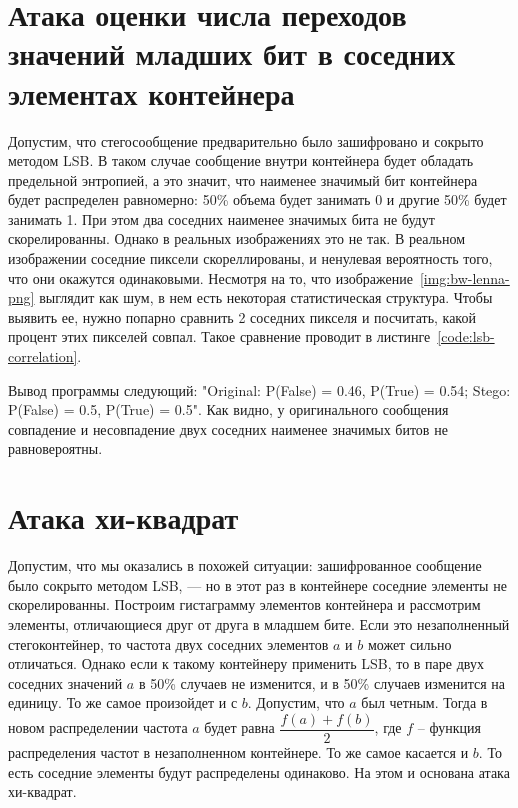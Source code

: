 \section{Атака оценки числа переходов значений младших бит в соседних элементах контейнера}
Допустим, что стегосообщение предварительно было зашифровано и сокрыто методом LSB.
В таком случае сообщение внутри контейнера будет обладать предельной энтропией,
а это значит, что наименее значимый бит контейнера будет распределен равномерно:
50\% объема будет занимать 0 и другие 50\% будет занимать 1. При этом два соседних
наименее значимых бита не будут скорелированны. Однако в реальных изображениях это не так.
В реальном изображении соседние пиксели скореллированы, и ненулевая вероятность того,
что они окажутся одинаковыми. Несмотря на то, что изображение~\ref{img:bw-lenna-png}
выглядит как шум, в нем есть некоторая статистическая структура. Чтобы выявить ее,
нужно попарно сравнить 2 соседних пикселя и посчитать, какой процент этих пикселей совпал.
Такое сравнение проводит в листинге~\ref{code:lsb-correlation}.

Вывод программы следующий: "Original: P(False) = 0.46, P(True) = 0.54; Stego: P(False) = 0.5, P(True) = 0.5".
Как видно, у оригинального сообщения совпадение и несовпадение двух соседних наименее значимых битов не равновероятны. 

\section{Атака хи-квадрат}
Допустим, что мы оказались в похожей ситуации: зашифрованное сообщение
было сокрыто методом LSB, --- но в этот раз в контейнере соседние элементы не скорелированны.
Построим гистаграмму элементов контейнера и рассмотрим элементы, отличающиеся друг от друга в младшем бите.
Если это незаполненный стегоконтейнер, то частота двух соседних элементов $a$ и $b$ может сильно отличаться.
Однако если к такому контейнеру применить LSB, то в паре двух соседних значений $a$ в 50\%
случаев не изменится, и в 50\% случаев изменится на единицу. То же самое произойдет и с $b$.
Допустим, что $a$ был четным. Тогда в новом распределении частота $a$ будет равна $\dfrac{ f(a) + f(b)}{2}$,
где $f$ -- функция распределения частот в незаполненном контейнере. То же самое касается и $b$.
То есть соседние элементы будут распределены одинаково. На этом и основана атака хи-квадрат.

